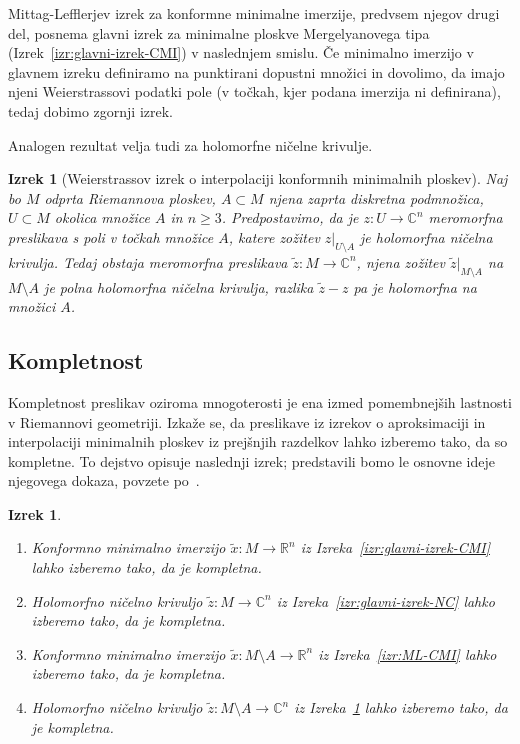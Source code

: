 \documentclass[12pt,a4paper,twoside]{article}
\theoremstyle{definition} %
\theoremstyle{plain} %
\newtheorem{izrek}[definicija]{Izrek}
\numberwithin{equation}{section}  %
\newcommand{\R}{\mathbb R}
\newcommand{\C}{\mathbb C}
\begin{document}
Mittag-Lefflerjev izrek za konformne minimalne imerzije, predvsem njegov drugi del, posnema glavni izrek za minimalne ploskve Mergelyanovega tipa (Izrek~\ref{izr:glavni-izrek-CMI}) v naslednjem smislu. Če minimalno imerzijo v glavnem izreku definiramo na punktirani dopustni množici in dovolimo, da imajo njeni Weierstrassovi podatki pole (v točkah, kjer podana imerzija ni definirana), tedaj dobimo zgornji izrek.

Analogen rezultat velja tudi za holomorfne ničelne krivulje.

\begin{izrek} [Weierstrassov izrek o interpolaciji konformnih minimalnih ploskev] \label{izr:Weierstrass-CMI}
Naj bo $M$ odprta Riemannova ploskev, $A \subset M$ njena zaprta diskretna podmnožica, $U \subset M$ okolica množice $A$ in $n \geq 3$.
Predpostavimo, da je $z \colon U \to \C^{n}$ meromorfna preslikava s poli v točkah množice $A$, katere zožitev $z|_{U \setminus A}$ je holomorfna ničelna krivulja.
Tedaj obstaja meromorfna preslikava $\tilde{z} \colon M \to \C^{n}$, njena zožitev $\tilde{z}|_{M \setminus A}$ na $M \setminus A$ je polna holomorfna ničelna krivulja, razlika $\tilde{z}-z$ pa je holomorfna na množici $A$.
\end{izrek}

\subsection{Kompletnost}
%
Kompletnost preslikav oziroma mnogoterosti je ena izmed pomembnejših lastnosti v Riemannovi geometriji. Izkaže se, da preslikave iz izrekov o aproksimaciji in interpolaciji minimalnih ploskev iz prejšnjih razdelkov lahko izberemo tako, da so kompletne. To dejstvo opisuje naslednji izrek; predstavili bomo le osnovne ideje njegovega dokaza, povzete po~\cite[str.~171--173]{alarcon2021minimal}. %

\begin{izrek} \label{izr:kompletnost}
\begin{enumerate}
\item Konformno minimalno imerzijo $\tilde{x} \colon M \to \R^{n}$ iz Izreka~\ref{izr:glavni-izrek-CMI} lahko izberemo tako, da je kompletna.
\item Holomorfno ničelno krivuljo $\tilde{z} \colon M \to \C^{n}$ iz Izreka~\ref{izr:glavni-izrek-NC} lahko izberemo tako, da je kompletna.
\item Konformno minimalno imerzijo $\tilde{x} \colon M \setminus A \to \R^{n}$ iz Izreka~\ref{izr:ML-CMI} lahko izberemo tako, da je kompletna.
\item Holomorfno ničelno krivuljo $\tilde{z} \colon M \setminus A \to \C^{n}$ iz Izreka~\ref{izr:Weierstrass-CMI} lahko izberemo tako, da je kompletna.
\end{enumerate}
\end{izrek}
\end{document}
